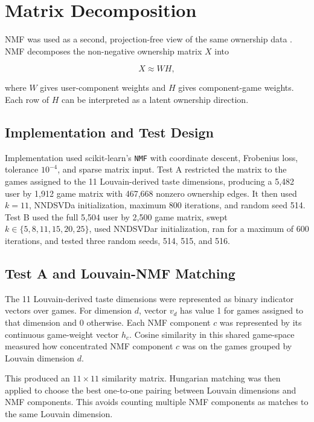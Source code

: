 \documentclass[10pt,twocolumn]{article}
\begin{document}
\section{Matrix Decomposition}

NMF was used as a second, projection-free view of the same ownership data \cite{lee2001}. NMF decomposes the non-negative ownership matrix $X$ into

\begin{equation}
X \approx WH,
\end{equation}

where $W$ gives user-component weights and $H$ gives component-game weights. Each row of $H$ can be interpreted as a latent ownership direction.

\subsection{Implementation and Test Design}

Implementation used scikit-learn's \texttt{NMF} with coordinate descent, Frobenius loss, tolerance $10^{-4}$, and sparse matrix input. Test A restricted the matrix to the games assigned to the 11 Louvain-derived taste dimensions, producing a 5,482 user by 1,912 game matrix with 467,668 nonzero ownership edges. It then used $k=11$, NNDSVDa initialization, maximum 800 iterations, and random seed 514. Test B used the full 5,504 user by 2,500 game matrix, swept $k \in \{5,8,11,15,20,25\}$, used NNDSVDar initialization, ran for a maximum of 600 iterations, and tested three random seeds, 514, 515, and 516.

\subsection{Test A and Louvain-NMF Matching}

The 11 Louvain-derived taste dimensions were represented as binary indicator vectors over games. For dimension $d$, vector $v_d$ has value 1 for games assigned to that dimension and 0 otherwise. Each NMF component $c$ was represented by its continuous game-weight vector $h_c$. Cosine similarity in this shared game-space measured how concentrated NMF component $c$ was on the games grouped by Louvain dimension $d$.

This produced an $11 \times 11$ similarity matrix. Hungarian matching was then applied to choose the best one-to-one pairing between Louvain dimensions and NMF components. This avoids counting multiple NMF components as matches to the same Louvain dimension.
\end{document}
